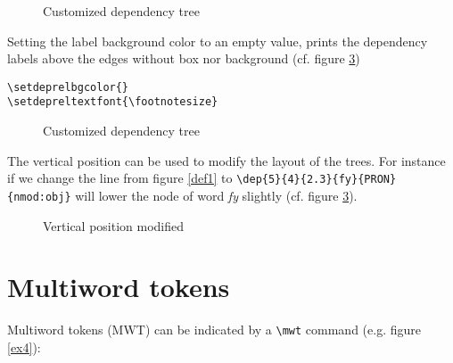 \documentclass[12pt]{article}
\begin{document}
\setdepreltextfont{\it\scriptsize}
\setwordfont{\large\sf}
\setposfont{\rm\small}
\setbottomwordfont{\footnotesize\sf}
\setmtwfont{\it\scriptsize}



\begin{figure}[H]
\beispiel
\caption{Customized dependency tree}\label{ex2}
\end{figure}


Setting the label background color to an empty value, prints the dependency labels
above the edges without box nor background (cf. figure \ref{ex3})

\begin{verbatim}
\setdeprelbgcolor{}
\setdepreltextfont{\footnotesize}
\end{verbatim}


\setdeprelbgcolor{}
\setdepreltextfont{\footnotesize}
\begin{figure}[H]
\beispielNOPOS
\caption{Customized dependency tree}\label{ex3}
\end{figure}

The vertical position can be used to modify the layout of the
trees. For instance if we change the line from figure \ref{def1}
to \verb+\dep{5}{4}{2.3}{fy}{PRON}{nmod:obj}+
 will lower the node of
word \emph{fy} slightly (cf. figure \ref{ex3}).


\begin{figure}[H]
\caption{Vertical position modified}\label{ex3}
\end{figure}


\section{Multiword tokens}
Multiword tokens (MWT) can be indicated by a \verb:\mwt: command
(e.g. figure \ref{ex4}):
\end{document}
